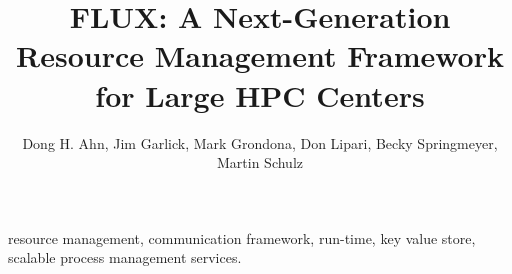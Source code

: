 \documentclass[conference]{IEEEtran}
\begin{document}
\title{FLUX: A Next-Generation Resource Management Framework for Large HPC Centers}
\author{Dong H. Ahn, Jim Garlick, Mark Grondona, Don Lipari, Becky Springmeyer, Martin Schulz}

\date{}
\maketitle


\newcommand{\flux}{Flux\xspace}
\newcommand{\zMQ}{\O{}MQ}



\begin{IEEEkeywords}
resource management, communication framework, run-time, key value store, 
scalable process management services.
\end{IEEEkeywords}







%

%






\end{document}
